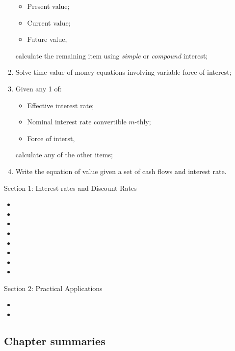 \begin{outcomes}
\begin{enumerate}[label = \alph*), leftmargin = *]
\begin{itemize}[leftmargin = *]
		\item	Present value;
		\item	Current value;
		\item	Future value,
		\end{itemize}
		calculate the remaining item using \textit{simple} or \textit{compound} interest;
	\item[]	Solve time value of money equations involving variable force of interest;
	\item	Given any 1 of:
		\begin{itemize}[leftmargin = *]
		\item	Effective interest rate;
		\item	Nominal interest rate convertible $m$-thly;
		\item	Force of interst,
		\end{itemize}
		calculate any of the other items;
	\item	Write the equation of value given a set of cash flows and interest rate.
\end{enumerate}
\end{outcomes}

\begin{ASM_chapter}
Section 1: Interest rates and Discount Rates
\begin{itemize}[leftmargin = *]
	\item	{}
	\item	{}
	\item	{}
	\item	{}
	\item	{}
	\item	{}
	\item	{}
	\item	{}
\end{itemize}
Section 2: Practical Applications
\begin{itemize}[leftmargin = *]
	\item	{}
	\item	{}
\end{itemize}
\end{ASM_chapter}

\subsection{Chapter summaries}

